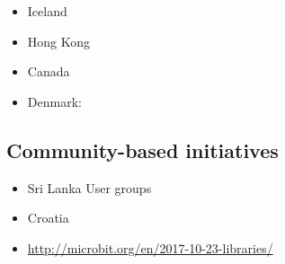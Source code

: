 \begin{itemize}
    \item Iceland
    \item Hong Kong
    \item Canada
    \item Denmark: 

\end{itemize}

\subsection{Community-based initiatives}

\begin{itemize}
    \item Sri Lanka User groups
    \item Croatia
    \item \url{http://microbit.org/en/2017-10-23-libraries/}
\end{itemize}



